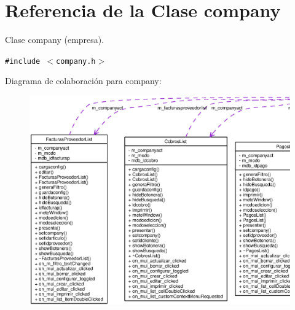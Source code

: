 \section{Referencia de la Clase company}
\label{classcompany}
Clase company (empresa).  


{\tt \#include $<$company.h$>$}

Diagrama de colaboraci\'{o}n para company:\begin{figure}[H]
\begin{center}
\leavevmode
\includegraphics[width=420pt]{classcompany__coll__graph}
\end{center}
\end{figure}
